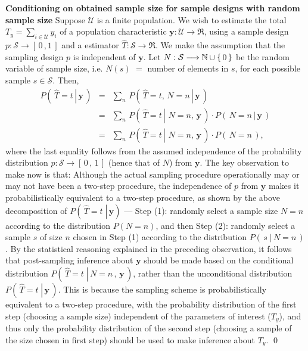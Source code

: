 \documentclass{article}
\begin{document}
\vskip 0.5cm
\noindent
\textbf{Conditioning on obtained sample size for sample designs with random sample size}\vskip 0.1cm
\noindent
Suppose $\mathcal{U}$ is a finite population.
We wish to estimate the total $T_{y} = \sum_{i\in\mathcal{U}}y_{i}$ of a
population characteristic $\mathbf{y} : \mathcal{U} \longrightarrow \Re$,
using a sample design $p: \mathcal{S} \longrightarrow [\,0\,,1\,]$
and a estimator $\widehat{T} : \mathcal{S} \longrightarrow \Re$.
{\color{red}We make the assumption that the sampling design $p$ is independent of $\mathbf{y}$.}
Let $N : \mathcal{S} \longrightarrow \mathbb{N}\cup\{\,0\,\}$ be the random variable
of sample size, i.e. $N(s)$ $=$ number of elements in $s$,
for each possible sample $s \in \mathcal{S}$. Then,
\begin{eqnarray*}
P\left(\,\left.\widehat{T} = t \,\right\vert\,\mathbf{y}\,\right)
&=&  \sum_{n}\,P\left(\,\left.\widehat{T} = t,\, N = n \,\right\vert\,\mathbf{y}\,\right) \\
&=&  \sum_{n}\,P\left(\,\left.\widehat{T} = t\,\right\vert\,\,N = n,\, \mathbf{y}\,\right)\cdot P\left(\left.\,N = n\,\right\vert\,\mathbf{y}\,\right)\\
&=&  \sum_{n}\,P\left(\,\left.\widehat{T} = t\,\right\vert\,\,N = n,\, \mathbf{y}\,\right)\cdot P\left(\,N = n\,\right),
\end{eqnarray*}
where the last equality follows from the assumed independence of the probability distribution
$p : \mathcal{S} \longrightarrow [\,0\,,\,1\,]$ (hence that of $N$) from $\mathbf{y}$.
The key observation to make now is that:
{\color{red}Although the actual sampling procedure operationally may or may not
have been a two-step procedure, the independence of $p$ from $\mathbf{y}$ makes it probabilistically
equivalent to a two-step procedure, as shown by the above decomposition of
$P\!\left(\,\left.\widehat{T} = t\;\right\vert\,\mathbf{y}\right)$}
--- Step (1): randomly select a sample size $N = n$ according to the distribution $P(N = n)$, and then
Step (2): randomly select a sample $s$ of size $n$ chosen in Step (1) according to the distribution
$P\!\left(\,s\;\vert\,N = n\,\right)$.
By the statistical reasoning explained in the preceding observation, it follows that
post-sampling inference about $\mathbf{y}$ should be made based on the conditional
distribution $P\!\left(\,\left.\widehat{T} = t\;\right\vert\,N = n\,,\,\mathbf{y}\,\right)$,
rather than the unconditional distribution $P\!\left(\,\left.\widehat{T} = t\;\right\vert\,\mathbf{y}\,\right)$.
This is because the sampling scheme is probabilistically equivalent to a two-step procedure,
with the probability distribution of the first step (choosing a sample size) independent of the parameters
of interest ($T_{y}$), and thus only the probability distribution of the second step (choosing a sample
of the size chosen in first step) should be used to make inference about $T_{y}$.
\qed
\end{document}
